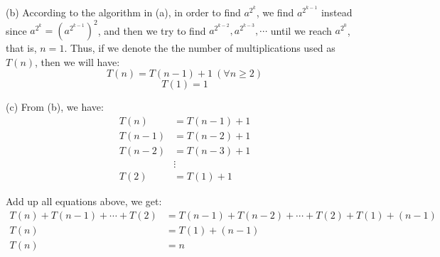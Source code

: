 \documentclass[a4paper,11pt]{article}
\begin{document}
\begin{spacing}{1.4}
    \setlength{\parindent}{0em}

    \vspace{5pt}

    (b) According to the algorithm in (a), in order to find $a^{2^k}$,
    we find $a^{2^{k-1}}$ instead since $a^{2^k}=(a^{2^{k-1}})^2$,
    and then we try to find $a^{2^{k-2}}, a^{2^{k-3}}, \cdots$ until
    we reach $a^{2^0}$, that is, $n=1$.
    Thus, if we denote the the number of multiplications used as 
    $T(n)$, then we will have: 
    $$T(n)=T(n-1)+1\ (\forall n\ge 2)$$
    $$T(1)=1$$

    \vspace{5pt}

    (c) From (b), we have:
    \begin{align*}
        T(n)&=T(n-1)+1\\
        T(n-1)&=T(n-2)+1\\
        T(n-2)&=T(n-3)+1\\
        &\vdots\\
        T(2)&=T(1)+1
    \end{align*}

    Add up all equations above, we get:
    \begin{align*}
        T(n)+T(n-1)+\cdots + T(2)&=T(n-1)+T(n-2)+\cdots + T(2)+T(1)+(n-1)\\
        T(n)&=T(1)+(n-1)\\
        T(n)&=n
    \end{align*}



    
    \end{spacing}
\end{document}
